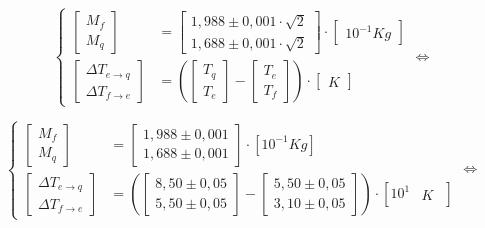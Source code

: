 \documentclass[a4paper]{article}
\begin{document}
			\[
			\begin{cases}
				\left[\begin{array}{c}
					M_{f}\\
					M_{q}
				\end{array}\right] & =\left[\begin{array}{c}
					1,988\pm0,001\cdot\sqrt{2}\\
					1,688\pm0,001\cdot\sqrt{2}
				\end{array}\right]\cdot\left[\begin{array}{c}
					10^{-1}\unit{Kg}\end{array}\right]\\
				\left[\begin{array}{c}
					\Delta T_{e\rightarrow q}\\
					\Delta T_{f\rightarrow e}
				\end{array}\right] & =\left(\left[\begin{array}{c}
						T_{q}\\
						T_{e}
					\end{array}\right]-\left[\begin{array}{c}
						T_{e}\\
						T_{f}
				\end{array}\right]\right)\cdot\left[\begin{array}{c}
					K
				\end{array}\right]
			\end{cases}\Longleftrightarrow
			\]


			\[
			\begin{cases}
				\left[\begin{array}{c}
					M_{f}\\
					M_{q}
				\end{array}\right] & =\left[\begin{array}{c}
					1,988\pm0,001\\
					1,688\pm0,001
				\end{array}\right]\cdot\left[10^{-1}\unit{Kg}\right]\\
				\left[\begin{array}{c}
					\Delta T_{e\rightarrow q}\\
					\Delta T_{f\rightarrow e}
				\end{array}\right] & =\left(\left[\begin{array}{c}
						8,50\pm0,05\\
						5,50\pm0,05
					\end{array}\right]-\left[\begin{array}{c}
						5,50\pm0,05\\
						3,10\pm0,05
				\end{array}\right]\right)\cdot\left[10^{1}\begin{array}{c}
				\begin{array}{c}
				\unit{K}\end{array}\end{array}\right]
			\end{cases}\Longleftrightarrow
			\]
\end{document}
